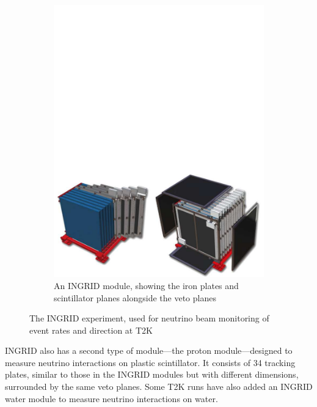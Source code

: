 \begin{figure}[h]
\begin{subfigure}[t]{0.47\textwidth}
		\includegraphics[width=\textwidth, trim={0mm 0mm 0mm 50mm}, clip,page=1]{figures/det_chap/ingrid/ingrid_module}
		\caption{An INGRID module, showing the iron plates and scintillator planes alongside the veto planes}
	\end{subfigure}
	\caption{The INGRID experiment, used for neutrino beam monitoring of event rates and direction at T2K}
	\label{fig:ingrid_det}
\end{figure}
INGRID also has a second type of module---the proton module---designed to measure neutrino interactions on plastic scintillator. It consists of 34 tracking plates, similar to those in the INGRID modules but with different dimensions, surrounded by the same veto planes\cite{t2k_ingrid_proton}. Some T2K runs have also added an INGRID water module to measure neutrino interactions on water.

